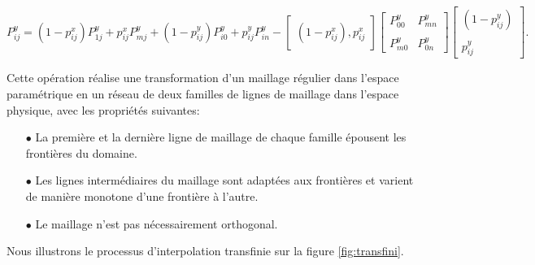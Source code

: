 $$
P_{ij}^y=(1-p_{ij}^x)P_{1j}^y+p_{ij}^xP_{mj}^y+(1-p_{ij}^y)P_{i0}^y+p_{ij}^y P_{in}^y-
\begin{bmatrix}
(1-p_{ij}^x), p_{ij}^x
\end{bmatrix}
\begin{bmatrix}
P_{00}^y&P_{mn}^y\\\\
P_{m0}^y&P_{0n}^y
\end{bmatrix}
\begin{bmatrix}
(1-p_{ij}^y)\\\\
p_{ij}^y
\end{bmatrix}.
$$

Cette opération réalise une transformation d'un maillage régulier dans l’espace paramétrique en un réseau de deux familles de lignes de maillage dans l’espace physique, avec les propriétés suivantes:\\
\begin{itemize}
 \item[$\bullet$]     La première et la dernière ligne de maillage de chaque famille épousent les frontières du domaine.\\
 \item[$\bullet$] Les lignes intermédiaires du maillage sont adaptées aux frontières et varient de manière monotone d’une frontière à l’autre.\\
 \item[$\bullet$] Le maillage n’est pas nécessairement orthogonal.\\
\end{itemize}
Nous illustrons le processus d'interpolation transfinie sur la figure \ref{fig:transfini}.

